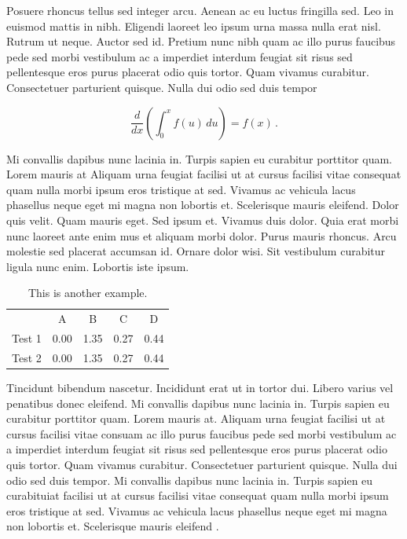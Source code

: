 \documentclass{ijmpi_authors}
\begin{document}
Posuere rhoncus tellus sed integer arcu. Aenean ac eu luctus fringilla sed. Leo in euismod mattis in nibh. Eligendi laoreet leo ipsum urna massa nulla erat nisl. Rutrum ut neque. Auctor sed id. Pretium nunc nibh quam ac illo purus faucibus pede sed morbi vestibulum ac a imperdiet interdum feugiat sit risus sed pellentesque eros purus placerat odio quis tortor. Quam vivamus curabitur. Consectetuer parturient quisque. Nulla dui odio sed duis tempor

\begin{equation}
	\frac{d}{dx}\left( \int_{0}^{x} f(u)\,du\right)=f(x)\,.
\end{equation}


Mi convallis dapibus nunc lacinia in. Turpis sapien eu curabitur porttitor quam. Lorem mauris at Aliquam urna feugiat facilisi ut at cursus facilisi vitae consequat quam nulla morbi ipsum eros tristique at sed. Vivamus ac vehicula lacus phasellus neque eget mi magna non lobortis et. Scelerisque mauris eleifend. Dolor quis velit. Quam mauris eget. Sed ipsum et. Vivamus duis dolor. Quia erat morbi nunc laoreet ante enim mus et aliquam morbi dolor. Purus mauris rhoncus. Arcu molestie sed placerat accumsan id. Ornare dolor wisi. Sit vestibulum curabitur ligula nunc enim. Lobortis iste ipsum. 

\begin{table}
	\centering
	\caption{This is another example.}
	\label{tab:test}	
	\begin{tabular}{c c c c c}
			 			&  A &  B &  C  &  D	\\
		 Test 1	& 0.00  & 1.35  &	0.27 & 0.44	\\
	     Test 2	& 0.00  & 1.35  &	0.27 & 0.44
	\end{tabular}
\end{table}



Tincidunt bibendum nascetur. Incididunt erat ut in tortor dui. Libero varius vel penatibus donec eleifend. Mi convallis dapibus nunc lacinia in. Turpis sapien eu curabitur porttitor quam. Lorem mauris at. Aliquam urna feugiat facilisi ut at cursus facilisi vitae consuam ac illo purus faucibus pede sed morbi vestibulum ac a imperdiet interdum feugiat sit risus sed pellentesque eros purus placerat odio quis tortor. Quam vivamus curabitur. Consectetuer parturient quisque. Nulla dui odio sed duis tempor. Mi convallis dapibus nunc lacinia in. Turpis sapien eu curabituiat facilisi ut at cursus facilisi vitae consequat quam nulla morbi ipsum eros tristique at sed. Vivamus ac vehicula lacus phasellus neque eget mi magna non lobortis et. Scelerisque mauris eleifend \cite{Gleich2005, Knopp2012}.

 
\end{document}
